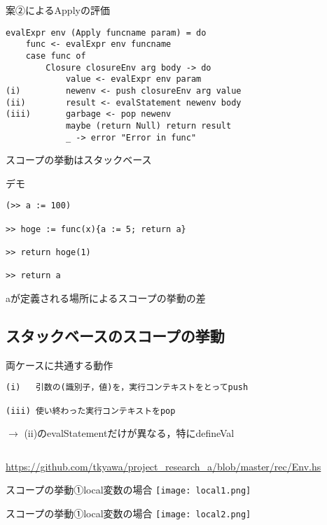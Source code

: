 \documentclass[uplatex,dvipdfmx,ja=standard]{beamer}
\begin{document}
\begin{frame}[fragile]{案②によるApplyの評価}
    \begin{verbatim}
evalExpr env (Apply funcname param) = do
    func <- evalExpr env funcname
    case func of
        Closure closureEnv arg body -> do
            value <- evalExpr env param
(i)         newenv <- push closureEnv arg value
(ii)        result <- evalStatement newenv body
(iii)       garbage <- pop newenv
            maybe (return Null) return result
            _ -> error "Error in func"
    \end{verbatim}
スコープの挙動はスタックベース
\end{frame}

\begin{frame}[fragile]{デモ}
    \begin{verbatim}
(>> a := 100)

>> hoge := func(x){a := 5; return a}

>> return hoge(1)

>> return a
    \end{verbatim}
aが定義される場所によるスコープの挙動の差
\end{frame}

\subsection{スタックベースのスコープの挙動}

\begin{frame}[fragile]{両ケースに共通する動作}
    \begin{verbatim}
(i)   引数の(識別子，値)を，実行コンテキストをとってpush

(iii) 使い終わった実行コンテキストをpop
    \end{verbatim}
$\to$ (ii)のevalStatementだけが異なる，特にdefineVal
    \begin{verbatim}
    \end{verbatim}

\url{https://github.com/tkyawa/project_research_a/blob/master/rec/Env.hs}
\end{frame}

\begin{frame}[fragile]{スコープの挙動①local変数の場合}
    \centering 
    \texttt{[image: local1.png]}
\end{frame}


\begin{frame}[fragile]{スコープの挙動①local変数の場合}
    \centering 
    \texttt{[image: local2.png]}
\end{frame}
\end{document}
